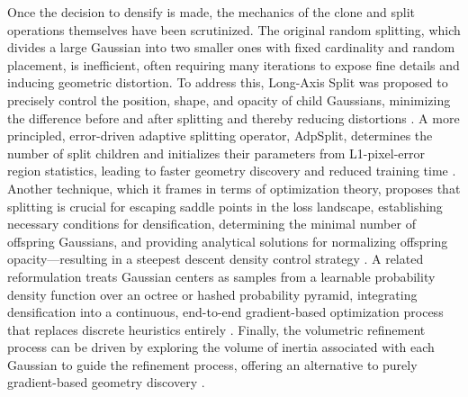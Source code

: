 \documentclass[11pt]{article}
\begin{document}
Once the decision to densify is made, the mechanics of the clone and split operations themselves have been scrutinized. The original random splitting, which divides a large Gaussian into two smaller ones with fixed cardinality and random placement, is inefficient, often requiring many iterations to expose fine details and inducing geometric distortion. To address this, Long-Axis Split was proposed to precisely control the position, shape, and opacity of child Gaussians, minimizing the difference before and after splitting and thereby reducing distortions \cite{ref124,ref42}. A more principled, error-driven adaptive splitting operator, AdpSplit, determines the number of split children and initializes their parameters from L1-pixel-error region statistics, leading to faster geometry discovery and reduced training time \cite{ref125}. Another technique, which it frames in terms of optimization theory, proposes that splitting is crucial for escaping saddle points in the loss landscape, establishing necessary conditions for densification, determining the minimal number of offspring Gaussians, and providing analytical solutions for normalizing offspring opacity---resulting in a steepest descent density control strategy \cite{ref126}. A related reformulation treats Gaussian centers as samples from a learnable probability density function over an octree or hashed probability pyramid, integrating densification into a continuous, end-to-end gradient-based optimization process that replaces discrete heuristics entirely \cite{ref127,ref128}. Finally, the volumetric refinement process can be driven by exploring the volume of inertia associated with each Gaussian to guide the refinement process, offering an alternative to purely gradient-based geometry discovery \cite{ref129}.
\end{document}
